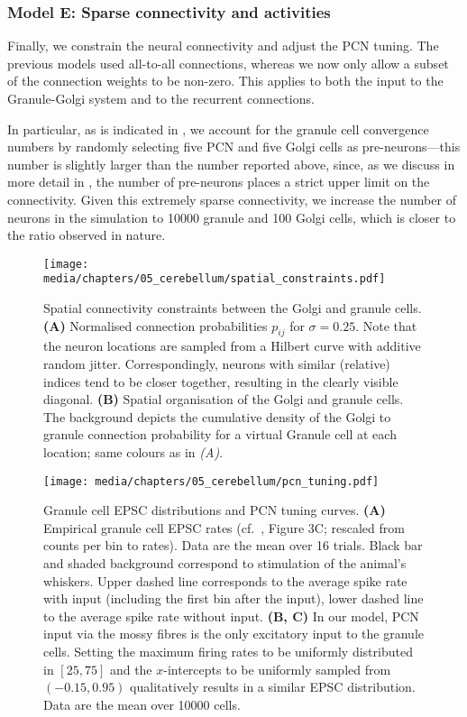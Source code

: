 \subsubsection{Model E: Sparse connectivity and activities}
Finally, we constrain the neural connectivity and adjust the PCN tuning.
The previous models used all-to-all connections, whereas we now only allow a subset of the connection weights to be non-zero.
This applies to both the input to the Granule-Golgi system and to the recurrent connections.

In particular, as is indicated in , we account for the granule cell convergence numbers by randomly selecting five PCN and five Golgi cells as pre-neurons---this number is slightly larger than the number reported above, since, as we discuss in more detail in , the number of pre-neurons places a strict upper limit on the connectivity. Given this extremely sparse connectivity, we increase the number of neurons in the simulation to \num{10000} granule and \num{100} Golgi cells, which is closer to the ratio observed in nature.

\begin{figure}
    \centering
    \texttt{[image: media/chapters/05\_cerebellum/spatial\_constraints.pdf]}
    \caption[Spatial connectivity constraints between the Golgi and granule cells]{Spatial connectivity constraints between the Golgi and granule cells.
    \textbf{(A)} Normalised connection probabilities $p_{ij}$ for $\sigma=0.25$. Note that the neuron locations are sampled from a Hilbert curve with additive random jitter. Correspondingly, neurons with similar (relative) indices tend to be closer together, resulting in the clearly visible diagonal.
    \textbf{(B)} Spatial organisation of the Golgi and granule cells. The background depicts the cumulative density of the Golgi to granule connection probability for a virtual Granule cell at each location; same colours as in \emph{(A)}.}
    \label{fig:spatial_constraints}
\end{figure}

\begin{figure}
	\centering
    \texttt{[image: media/chapters/05\_cerebellum/pcn\_tuning.pdf]}
    \caption[Granule cell EPSC distributions and PCN tuning curves]{Granule cell EPSC distributions and PCN tuning curves.
    \textbf{(A)} Empirical granule cell EPSC rates (cf.~\cite{chadderton2004integration}, Figure 3C; rescaled from counts per bin to rates).
    Data are the mean over 16 trials.
    Black bar and shaded background correspond to stimulation of the animal's whiskers.
    Upper dashed line corresponds to the average spike rate with input (including the first bin after the input), lower dashed line to the average spike rate without input.
    \textbf{(B, C)} In our model, PCN input via the mossy fibres is the only excitatory input to the granule cells. Setting the maximum firing rates to be uniformly distributed in $[25, 75]$ and the $x$-intercepts to be uniformly sampled from $(-0.15, 0.95)$ qualitatively results in a similar EPSC distribution. Data are the mean over \num{10000} cells.
    }
    \label{fig:pcn_tuning}
\end{figure}

